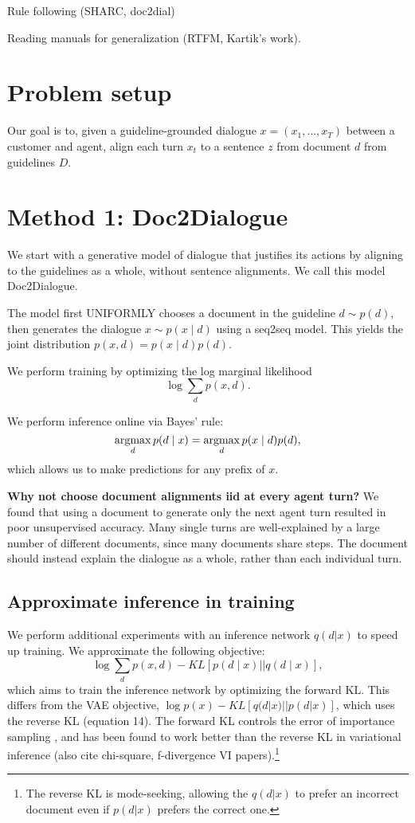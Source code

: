 \documentclass[11pt]{article}
\begin{document}
Rule following (SHARC, doc2dial)

Reading manuals for generalization (RTFM, Kartik's work).

\section{Problem setup}
Our goal is to, given a guideline-grounded dialogue $x = (x_1,\ldots,x_T)$
between a customer and agent,
align each turn $x_t$ to a sentence $z$ from document $d$ from guidelines $D$.


\section{Method 1: Doc2Dialogue}
We start with a generative model of dialogue that justifies its actions by
aligning to the guidelines as a whole, without sentence alignments.
We call this model Doc2Dialogue.

The model first UNIFORMLY chooses a document in the guideline $d \sim p(d)$,
then generates the dialogue $x \sim p(x \mid d)$ using a seq2seq model.
This yields the joint distribution $p(x,d) = p(x\mid d)p(d)$.

We perform training by optimizing the log marginal likelihood
\begin{equation}
\log\sum_d p(x,d).
\end{equation}

We perform inference online via Bayes' rule:
\begin{equation}
\operatorname*{argmax}_d p(d\mid x) = \operatorname*{argmax}_d p(x\mid d)p(d),
\end{equation}
which allows us to make predictions for any prefix of $x$.

\textbf{Why not choose document alignments iid at every agent turn?}
We found that using a document to generate only the next agent turn resulted in poor
unsupervised accuracy.
Many single turns are well-explained by a large number of different documents,
since many documents share steps.
The document should instead explain the dialogue as a whole, rather than each individual turn.

\subsection{Approximate inference in training}
We perform additional experiments with an inference network $q(d|x)$ to speed up training.
We approximate the following objective:
\begin{equation}
\label{eqn:fkl}
\log\sum_d p(x,d) - KL[p(d\mid x) || q(d \mid x)],
\end{equation}
which aims to train the inference network by optimizing the forward KL.
This differs from the VAE objective,
$\log p(x) - KL[q(d|x) || p(d|x)]$,
which uses the reverse KL \cite{blei} (equation 14).
The forward KL controls the error of importance sampling \cite{chatterjee},
and has been found to work better than the reverse KL in variational inference \cite{fkl}
(also cite chi-square, f-divergence VI papers).\footnote{
The reverse KL is mode-seeking,
allowing the $q(d|x)$ to prefer an incorrect document
even if $p(d|x)$ prefers the correct one.
}
\end{document}
